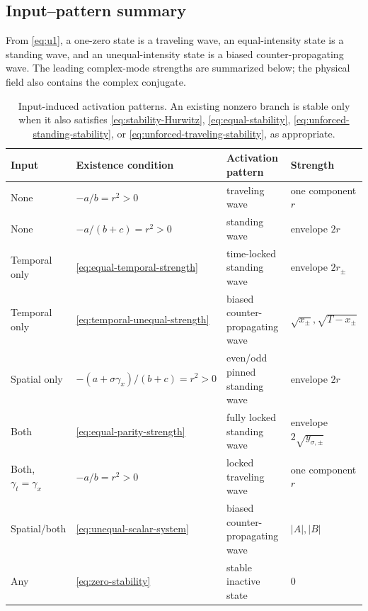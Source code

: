 \subsection{Input--pattern summary}

From \eqref{eq:u1}, a one-zero state is a traveling wave, an
equal-intensity state is a standing wave, and an unequal-intensity state is
a biased counter-propagating wave.  The leading complex-mode strengths are
summarized below; the physical field also contains the complex conjugate.
\begin{table}[ht]
\centering
\small
\begin{tabular}{@{}llll@{}}
\toprule
Input & Existence condition & Activation pattern & Strength \\
\midrule
None
& $-a/b=r^2>0$
& traveling wave
& one component $r$ \\
None
& $-a/(b+c)=r^2>0$
& standing wave
& envelope $2r$ \\
Temporal only
& \eqref{eq:equal-temporal-strength}
& time-locked standing wave
& envelope $2r_\pm$ \\
Temporal only
& \eqref{eq:temporal-unequal-strength}
& biased counter-propagating wave
& $\sqrt{x_\pm},\sqrt{T-x_\pm}$ \\
Spatial only
& $-(a+\sigma\gamma_x)/(b+c)=r^2>0$
& even/odd pinned standing wave
& envelope $2r$ \\
Both
& \eqref{eq:equal-parity-strength}
& fully locked standing wave
& envelope $2\sqrt{y_{\sigma,\pm}}$ \\
Both, $\gamma_t=\gamma_x$
& $-a/b=r^2>0$
& locked traveling wave
& one component $r$ \\
Spatial/both
& \eqref{eq:unequal-scalar-system}
& biased counter-propagating wave
& $|A|,|B|$ \\
Any
& \eqref{eq:zero-stability}
& stable inactive state
& $0$ \\
\bottomrule
\end{tabular}
\caption{Input-induced activation patterns.  An existing nonzero branch is
stable only when it also satisfies \eqref{eq:stability-Hurwitz},
\eqref{eq:equal-stability}, \eqref{eq:unforced-standing-stability}, or
\eqref{eq:unforced-traveling-stability}, as appropriate.}
\label{tab:input-patterns}
\end{table}
